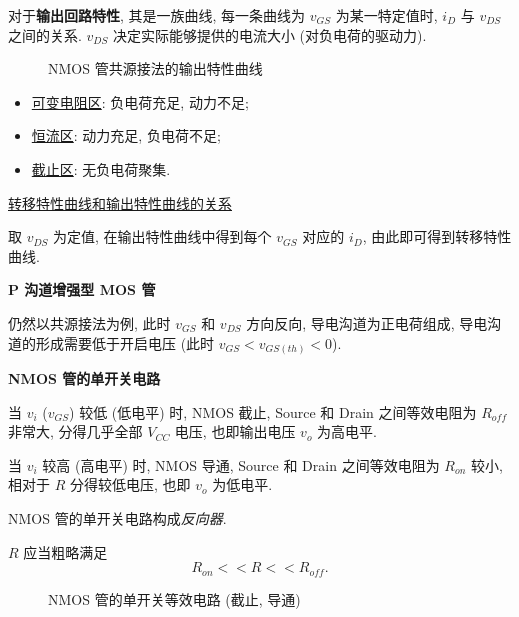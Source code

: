 对于\textbf{输出回路特性}, 其是一族曲线, 每一条曲线为 $v_{GS}$ 为某一特定值时, $i_D$ 与 $v_{DS}$ 之间的关系. $v_{DS}$ 决定实际能够提供的电流大小 (对负电荷的驱动力).

\begin{figure}[H]
    \begin{minipage}{.48\textwidth}
        \centering

        \caption{NMOS 管共源接法的转移特性曲线}
    \end{minipage} \hfill
    \begin{minipage}{.48\textwidth}
        \centering

        \caption{NMOS 管共源接法的输出特性曲线}
    \end{minipage}
\end{figure}

\begin{itemize}
    \item \underline{可变电阻区}: 负电荷充足, 动力不足;
    \item \underline{恒流区}: 动力充足, 负电荷不足;
    \item \underline{截止区}: 无负电荷聚集.
\end{itemize}

\underline{转移特性曲线和输出特性曲线的关系}

取 $v_{DS}$ 为定值, 在输出特性曲线中得到每个 $v_{GS}$ 对应的 $i_D$, 由此即可得到转移特性曲线.

\textbf{P 沟道增强型 MOS 管}

仍然以共源接法为例, 此时 $v_{GS}$ 和 $v_{DS}$ 方向反向, 导电沟道为正电荷组成, 导电沟道的形成需要低于开启电压 (此时 $v_{GS}<v_{GS(th)}<0$).

\textbf{NMOS 管的单开关电路}

当 $v_i$ ($v_{GS}$) 较低 (低电平) 时, NMOS 截止, Source 和 Drain 之间等效电阻为 $R_{off}$ 非常大, 分得几乎全部 $V_{CC}$ 电压, 也即输出电压 $v_o$ 为高电平.

当 $v_i$ 较高 (高电平) 时, NMOS 导通, Source 和 Drain 之间等效电阻为 $R_{on}$ 较小, 相对于 $R$ 分得较低电压, 也即 $v_o$ 为低电平.

NMOS 管的单开关电路构成\textit{反向器}.

$R$ 应当粗略满足
\begin{equation}
    R_{on}<<R<<R_{off}.
\end{equation}

\begin{figure}[H]
    \centering

    \caption{NMOS 管的单开关等效电路 (截止, 导通)}
\end{figure}

